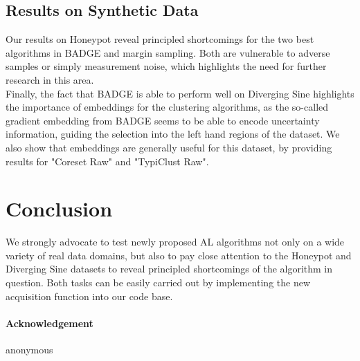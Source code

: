\documentclass[]{article}
\begin{document}
\subsection{Results on Synthetic Data}
Our results on Honeypot reveal principled shortcomings for the two best algorithms in BADGE and margin sampling.
Both are vulnerable to adverse samples or simply measurement noise, which highlights the need for further research in this area. \\
Finally, the fact that BADGE is able to perform well on Diverging Sine highlights the importance of embeddings for the clustering algorithms, as the so-called gradient embedding from BADGE seems to be able to encode uncertainty information, guiding the selection into the left hand regions of the dataset. 
We also show that embeddings are generally useful for this dataset, by providing results for "Coreset Raw" and "TypiClust Raw".


\section{Conclusion}
We strongly advocate to test newly proposed AL algorithms not only on a wide variety of real data domains, but also to pay close attention to the Honeypot and Diverging Sine datasets to reveal principled shortcomings of the algorithm in question.
Both tasks can be easily carried out by implementing the new acquisition function into our code base.


\newpage
\paragraph{Acknowledgement}
anonymous




 
\end{document}
